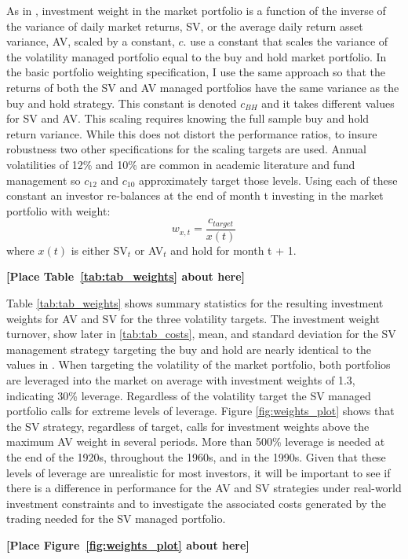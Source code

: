 As in \citet{moreira_volatility-managed_2017}, investment weight in the market portfolio is a function of the inverse of the variance of daily market returns, SV, or the average daily return asset variance, AV, scaled by a constant, $c$. \citet{moreira_volatility-managed_2017} use a constant that scales the variance of the volatility managed portfolio equal to the buy and hold market portfolio. In the basic portfolio weighting specification, I use the same approach so that the returns of both the SV and AV managed portfolios have the same variance as the buy and hold strategy. This constant is denoted $c_{BH}$ and it takes different values for SV and AV. This scaling requires knowing the full sample buy and hold return variance. While this does not distort the performance ratios, to insure robustness two other specifications for the scaling targets are used. Annual volatilities of 12\% and 10\% are common in academic literature and fund management so $c_{12}$ and $c_{10}$ approximately target those levels. \citep{barroso_momentum_2015,morrison_guarantees_nodate,verma_volatility-targeting_2018,fleming_economic_nodate,hocquard_constant-volatility_2013} Using each of these constant an investor re-balances at the end of month t investing in the market portfolio with weight:
\begin{equation}
	w_{x,t} = \frac{c_{target}}{x(t)}
\end{equation} where $x(t)$ is either SV$_{t}$ or AV$_{t}$ and hold for month t + 1. 

\bigskip
\centerline{\bf [Place Table~\ref{tab:tab_weights} about here]}
\bigskip
Table \ref{tab:tab_weights} shows summary statistics for the resulting investment weights for AV and SV for the three volatility targets. The investment weight turnover, show later in \ref{tab:tab_costs}, mean, and standard deviation for the SV management strategy targeting the buy and hold are nearly identical to the values in \citet{moreira_volatility-managed_2017}. When targeting the volatility of the market portfolio, both portfolios are leveraged into the market on average with investment weights of 1.3, indicating 30\% leverage. Regardless of the volatility target the SV managed portfolio calls for extreme levels of leverage. Figure \ref{fig:weights_plot} shows that the SV strategy, regardless of target, calls for investment weights above the maximum AV weight in several periods. More than 500\% leverage is needed at the end of the 1920s, throughout the 1960s, and in the 1990s. Given that these levels of leverage are unrealistic for most investors, it will be important to see if there is a difference in performance for the AV and SV strategies under real-world investment constraints and to investigate the associated costs generated by the trading needed for the SV managed portfolio.
\bigskip
\centerline{\bf [Place Figure~\ref{fig:weights_plot} about here]}
\bigskip
